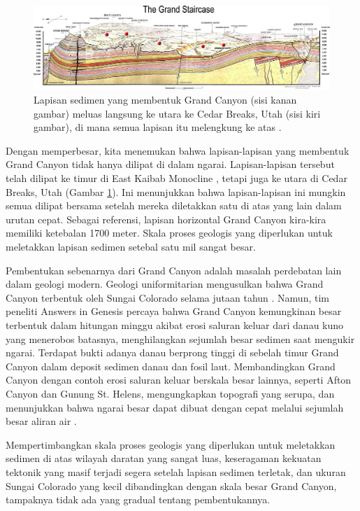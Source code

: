 \documentclass[10pt,twocolumn,letterpaper]{article}
\begin{document}
\begin{figure}
\begin{center}
\includegraphics[width=1\textwidth]{Grand_Staircase-big.jpg}
\end{center}
   \caption{Lapisan sedimen yang membentuk Grand Canyon (sisi kanan gambar) meluas langsung ke utara ke Cedar Breaks, Utah (sisi kiri gambar), di mana semua lapisan itu melengkung ke atas \cite{50}.}
\label{fig:4}
\end{figure}

Dengan memperbesar, kita menemukan bahwa lapisan-lapisan yang membentuk Grand Canyon tidak hanya dilipat di dalam ngarai. Lapisan-lapisan tersebut telah dilipat ke timur di East Kaibab Monocline \cite{46}, tetapi juga ke utara di Cedar Breaks, Utah (Gambar \ref{fig:4}). Ini menunjukkan bahwa lapisan-lapisan ini mungkin semua dilipat bersama setelah mereka diletakkan satu di atas yang lain dalam urutan cepat. Sebagai referensi, lapisan horizontal Grand Canyon kira-kira memiliki ketebalan 1700 meter. Skala proses geologis yang diperlukan untuk meletakkan lapisan sedimen setebal satu mil sangat besar.

Pembentukan sebenarnya dari Grand Canyon adalah masalah perdebatan lain dalam geologi modern. Geologi uniformitarian mengusulkan bahwa Grand Canyon terbentuk oleh Sungai Colorado selama jutaan tahun \cite{47}. Namun, tim peneliti Answers in Genesis percaya bahwa Grand Canyon kemungkinan besar terbentuk dalam hitungan minggu akibat erosi saluran keluar dari danau kuno yang menerobos batasnya, menghilangkan sejumlah besar sedimen saat mengukir ngarai. Terdapat bukti adanya danau berprong tinggi di sebelah timur Grand Canyon dalam deposit sedimen danau dan fosil laut. Membandingkan Grand Canyon dengan contoh erosi saluran keluar berskala besar lainnya, seperti Afton Canyon dan Gunung St. Helens, mengungkapkan topografi yang serupa, dan menunjukkan bahwa ngarai besar dapat dibuat dengan cepat melalui sejumlah besar aliran air \cite{48}.

Mempertimbangkan skala proses geologis yang diperlukan untuk meletakkan sedimen di atas wilayah daratan yang sangat luas, keseragaman kekuatan tektonik yang masif terjadi segera setelah lapisan sedimen terletak, dan ukuran Sungai Colorado yang kecil dibandingkan dengan skala besar Grand Canyon, tampaknya tidak ada yang gradual tentang pembentukannya.
\end{document}
